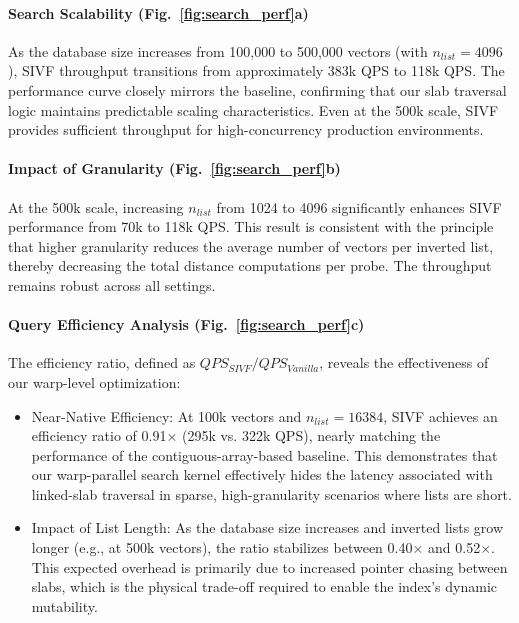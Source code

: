 \documentclass[sigconf,nonacm]{acmart}
\theoremstyle{plain}
\theoremstyle{definition}
\theoremstyle{remark}
\begin{document}
\paragraph{Search Scalability (Fig.~\ref{fig:search_perf}a)}
As the database size increases from 100,000 to 500,000 vectors (with $n_{list}=4096$), SIVF throughput transitions from approximately 383k QPS to 118k QPS. The performance curve closely mirrors the baseline, confirming that our slab traversal logic maintains predictable scaling characteristics. Even at the 500k scale, SIVF provides sufficient throughput for high-concurrency production environments.

\paragraph{Impact of Granularity (Fig.~\ref{fig:search_perf}b)}
At the 500k scale, increasing $n_{list}$ from 1024 to 4096 significantly enhances SIVF performance from 70k to 118k QPS. This result is consistent with the principle that higher granularity reduces the average number of vectors per inverted list, thereby decreasing the total distance computations per probe. The throughput remains robust across all settings.

\paragraph{Query Efficiency Analysis (Fig.~\ref{fig:search_perf}c)}
The efficiency ratio, defined as $QPS_{SIVF} / QPS_{Vanilla}$, reveals the effectiveness of our warp-level optimization:
\begin{itemize}
    \item Near-Native Efficiency: At 100k vectors and $n_{list}=16384$, SIVF achieves an efficiency ratio of 0.91$\times$ (295k vs. 322k QPS), nearly matching the performance of the contiguous-array-based baseline. This demonstrates that our warp-parallel search kernel effectively hides the latency associated with linked-slab traversal in sparse, high-granularity scenarios where lists are short.
    \item Impact of List Length: As the database size increases and inverted lists grow longer (e.g., at 500k vectors), the ratio stabilizes between 0.40$\times$ and 0.52$\times$. This expected overhead is primarily due to increased pointer chasing between slabs, which is the physical trade-off required to enable the index's dynamic mutability.
\end{itemize}
\end{document}
